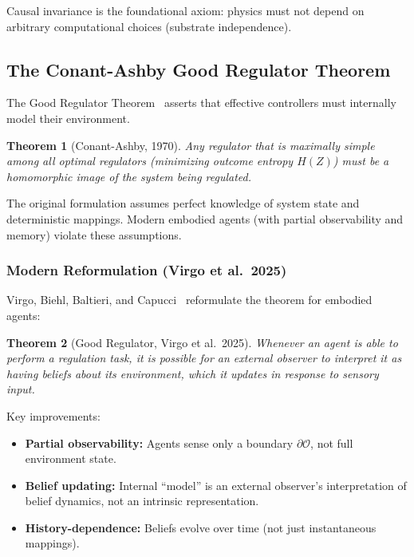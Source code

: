 \documentclass[11pt,a4paper]{article}
\theoremstyle{plain}
\newtheorem{theorem}{Theorem}[section]
\theoremstyle{definition}
\theoremstyle{remark}
\newcommand{\Ocal}{\mathcal{O}}
\newcommand{\boundary}{\partial}
\begin{document}
Causal invariance is the foundational axiom: physics must not depend on arbitrary computational choices (substrate independence).

\subsection{The Conant-Ashby Good Regulator Theorem}

The Good Regulator Theorem~\cite{conant1970every} asserts that effective controllers must internally model their environment.

\begin{theorem}[Conant-Ashby, 1970]
\label{thm:conant_ashby_original}
Any regulator that is \emph{maximally simple} among all \emph{optimal regulators} (minimizing outcome entropy $H(Z)$) must be a homomorphic image of the system being regulated.
\end{theorem}

The original formulation assumes perfect knowledge of system state and deterministic mappings. Modern embodied agents (with partial observability and memory) violate these assumptions.

\subsubsection{Modern Reformulation (Virgo et al.~2025)}

Virgo, Biehl, Baltieri, and Capucci~\cite{virgo2025good} reformulate the theorem for embodied agents:

\begin{theorem}[Good Regulator, Virgo et al.~2025]
\label{thm:virgo}
Whenever an agent is able to perform a regulation task, it is possible for an external observer to interpret it as having \emph{beliefs} about its environment, which it \emph{updates} in response to sensory input.
\end{theorem}

Key improvements:
\begin{itemize}[noitemsep]
\item \textbf{Partial observability:} Agents sense only a boundary $\boundary \Ocal$, not full environment state.
\item \textbf{Belief updating:} Internal ``model'' is an external observer's interpretation of belief dynamics, not an intrinsic representation.
\item \textbf{History-dependence:} Beliefs evolve over time (not just instantaneous mappings).
\end{itemize}
\end{document}

